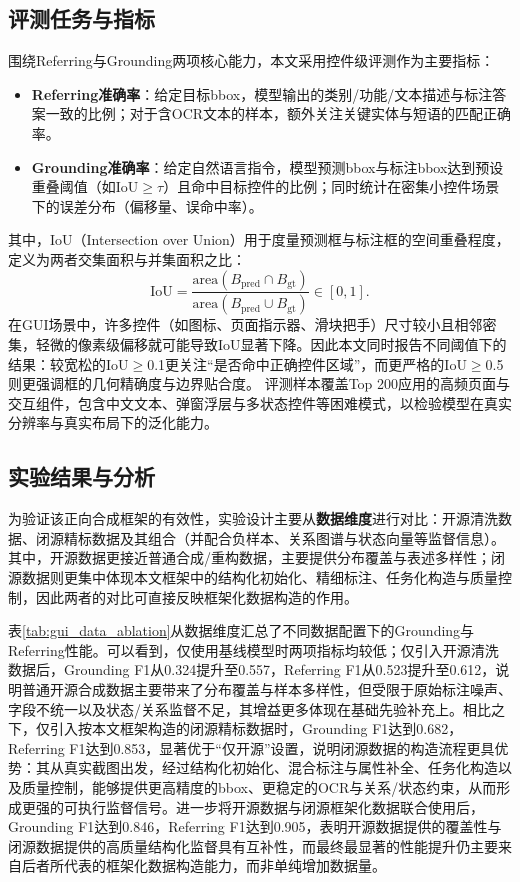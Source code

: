 \subsection{评测任务与指标}
围绕Referring与Grounding两项核心能力，本文采用控件级评测作为主要指标：
\begin{itemize}
  \item \textbf{Referring准确率}：给定目标bbox，模型输出的类别/功能/文本描述与标注答案一致的比例；对于含OCR文本的样本，额外关注关键实体与短语的匹配正确率。
  \item \textbf{Grounding准确率}：给定自然语言指令，模型预测bbox与标注bbox达到预设重叠阈值（如IoU$\ge\tau$）且命中目标控件的比例；同时统计在密集小控件场景下的误差分布（偏移量、误命中率）。
\end{itemize}
其中，IoU（Intersection over Union）用于度量预测框与标注框的空间重叠程度，定义为两者交集面积与并集面积之比：
\[
\mathrm{IoU}=\frac{\mathrm{area}(B_{\text{pred}}\cap B_{\text{gt}})}{\mathrm{area}(B_{\text{pred}}\cup B_{\text{gt}})}\in[0,1].
\]
在GUI场景中，许多控件（如图标、页面指示器、滑块把手）尺寸较小且相邻密集，轻微的像素级偏移就可能导致IoU显著下降。因此本文同时报告不同阈值下的结果：较宽松的IoU$\ge$0.1更关注“是否命中正确控件区域”，而更严格的IoU$\ge$0.5则更强调框的几何精确度与边界贴合度。
评测样本覆盖Top 200应用的高频页面与交互组件，包含中文文本、弹窗浮层与多状态控件等困难模式，以检验模型在真实分辨率与真实布局下的泛化能力。

\subsection{实验结果与分析}
为验证该正向合成框架的有效性，实验设计主要从\textbf{数据维度}进行对比：开源清洗数据、闭源精标数据及其组合（并配合负样本、关系图谱与状态向量等监督信息）。其中，开源数据更接近普通合成/重构数据，主要提供分布覆盖与表述多样性；闭源数据则更集中体现本文框架中的结构化初始化、精细标注、任务化构造与质量控制，因此两者的对比可直接反映框架化数据构造的作用。

表\ref{tab:gui_data_ablation}从数据维度汇总了不同数据配置下的Grounding与Referring性能。可以看到，仅使用基线模型时两项指标均较低；仅引入开源清洗数据后，Grounding F1从0.324提升至0.557，Referring F1从0.523提升至0.612，说明普通开源合成数据主要带来了分布覆盖与样本多样性，但受限于原始标注噪声、字段不统一以及状态/关系监督不足，其增益更多体现在基础先验补充上。相比之下，仅引入按本文框架构造的闭源精标数据时，Grounding F1达到0.682，Referring F1达到0.853，显著优于“仅开源”设置，说明闭源数据的构造流程更具优势：其从真实截图出发，经过结构化初始化、混合标注与属性补全、任务化构造以及质量控制，能够提供更高精度的bbox、更稳定的OCR与关系/状态约束，从而形成更强的可执行监督信号。进一步将开源数据与闭源框架化数据联合使用后，Grounding F1达到0.846，Referring F1达到0.905，表明开源数据提供的覆盖性与闭源数据提供的高质量结构化监督具有互补性，而最终最显著的性能提升仍主要来自后者所代表的框架化数据构造能力，而非单纯增加数据量。

